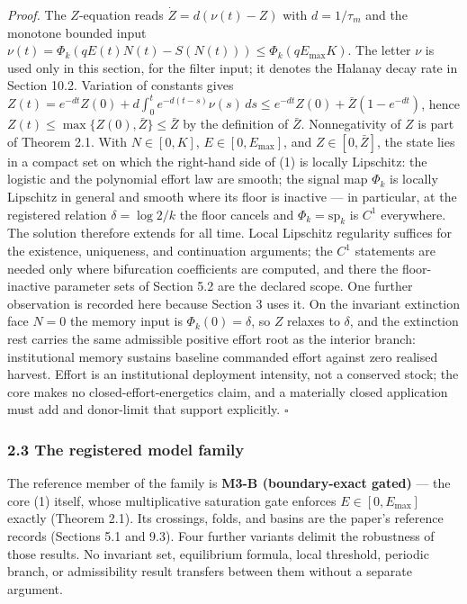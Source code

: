 \documentclass[11pt]{article}
\begin{document}
\emph{Proof.} The \(Z\)-equation reads \(\dot Z = d(\nu(t) - Z)\) with
\(d = 1/\tau_m\) and the monotone bounded input
\(\nu(t) = \Phi_k(qE(t)N(t) - S(N(t))) \le \Phi_k(qE_{\max}K)\). The
letter \(\nu\) is used only in this section, for the filter input; it
denotes the Halanay decay rate in Section 10.2. Variation of constants
gives
\(Z(t) = e^{-dt}Z(0) + d\int_0^t e^{-d(t-s)}\nu(s)\,ds \le e^{-dt}Z(0) + \bar Z(1 - e^{-dt})\),
hence \(Z(t) \le \max\{Z(0), \bar Z\} \le \bar Z\) by the definition of
\(\bar Z\). Nonnegativity of \(Z\) is part of Theorem 2.1. With
\(N \in [0,K]\), \(E \in [0, E_{\max}]\), and \(Z \in [0, \bar Z]\), the
state lies in a compact set on which the right-hand side of (1) is
locally Lipschitz: the logistic and the polynomial effort law are
smooth; the signal map \(\Phi_k\) is locally Lipschitz in general and
smooth where its floor is inactive --- in particular, at the registered
relation \(\delta = \log 2 / k\) the floor cancels and
\(\Phi_k = \mathrm{sp}_k\) is \(C^1\) everywhere. The solution therefore
extends for all time. Local Lipschitz regularity suffices for the
existence, uniqueness, and continuation arguments; the \(C^1\)
statements are needed only where bifurcation coefficients are computed,
and there the floor-inactive parameter sets of Section 5.2 are the
declared scope. One further observation is recorded here because Section
3 uses it. On the invariant extinction face \(N = 0\) the memory input
is \(\Phi_k(0) = \delta\), so \(Z\) relaxes to \(\delta\), and the
extinction rest carries the same admissible positive effort root as the
interior branch: institutional memory sustains baseline commanded effort
against zero realised harvest. Effort is an institutional deployment
intensity, not a conserved stock; the core makes no
closed-effort-energetics claim, and a materially closed application must
add and donor-limit that support explicitly. \ensuremath{\square}

\subsubsection{2.3 The registered model
family}\label{the-registered-model-family}

The reference member of the family is \textbf{M3-B (boundary-exact
gated)} --- the core (1) itself, whose multiplicative saturation gate
enforces \(E \in [0, E_{\max}]\) exactly (Theorem 2.1). Its crossings,
folds, and basins are the paper's reference records (Sections 5.1 and
9.3). Four further variants delimit the robustness of those results. No
invariant set, equilibrium formula, local threshold, periodic branch, or
admissibility result transfers between them without a separate argument.
\end{document}
